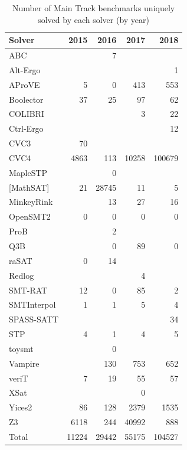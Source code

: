 \documentclass[dvipsnames,table,twoside,11pt]{article}
\newcommand{\maintrack}{Main Track\xspace}
\begin{document}
\begin{table}
  \caption{Number of \maintrack benchmarks uniquely solved by each
    solver (by year)}
  \label{table:unique-solutions}
  \centering
  \begin{tabular}{lrrrr}
    \toprule
    Solver & 2015 & 2016 & 2017 & 2018 \\
    \midrule
    ABC               &       & 7     &       &        \\
    Alt-Ergo          &       &       &       & 1      \\
    AProVE            & 5     & 0     & 413   & 553    \\
    Boolector         & 37    & 25    & 97    & 62     \\
    COLIBRI           &       &       & 3     & 22     \\
    Ctrl-Ergo         &       &       &       & 12     \\
    CVC3              & 70    &       &       &        \\
    CVC4              & 4863  & 113   & 10258 & 100679 \\
    MapleSTP          &       & 0     &       &        \\
    {[}MathSAT{]}     & 21    & 28745 & 11    & 5      \\
    MinkeyRink        &       & 13    & 27    & 16     \\
    OpenSMT2          & 0     & 0     & 0     & 0      \\
    ProB              &       & 2     &       &        \\
    Q3B               &       & 0     & 89    & 0      \\
    raSAT             & 0     & 14    &       &        \\
    Redlog            &       &       & 4     &        \\
    SMT-RAT           & 12    & 0     & 85    & 2      \\
    SMTInterpol       & 1     & 1     & 5     & 4      \\
    SPASS-SATT        &       &       &       & 34     \\
    STP               & 4     & 1     & 4     & 5      \\
    toysmt            &       & 0     &       &        \\
    Vampire           &       & 130   & 753   & 652    \\
    veriT             & 7     & 19    & 55    & 57     \\
    XSat              &       &       & 0     &        \\
    Yices2            & 86    & 128   & 2379  & 1535   \\
    Z3                & 6118  & 244   & 40992 & 888    \\
    \midrule
    Total             & 11224 & 29442 & 55175 & 104527 \\
    \bottomrule
  \end{tabular}
\end{table}
\end{document}
